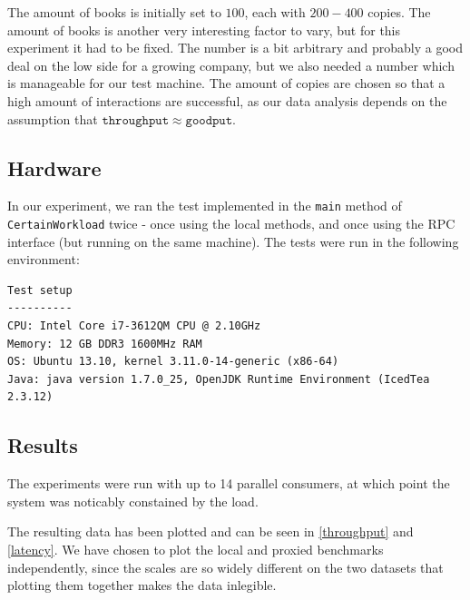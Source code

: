 \documentclass[11pt,a4paper]{article}
\begin{document}
The amount of books is initially set to $100$, each with $200-400$ copies.
The amount of books is another very interesting factor to vary, but for this
experiment it had to be fixed. The number is a bit arbitrary and probably a
good deal on the low side for a growing company, but we also needed a number
which is manageable for our test machine. The amount of copies are chosen so
that a high amount of interactions are successful, as our data analysis depends
on the assumption that $\mathtt{throughput} \approx \mathtt{goodput}$.

\subsection*{Hardware}
In our experiment, we ran the test implemented in the \texttt{main} method of
\texttt{CertainWorkload} twice - once using the local methods, and once using
the RPC interface (but running on the same machine). The tests were run in the
following environment:

\begin{verbatim}
Test setup
----------
CPU: Intel Core i7-3612QM CPU @ 2.10GHz
Memory: 12 GB DDR3 1600MHz RAM
OS: Ubuntu 13.10, kernel 3.11.0-14-generic (x86-64) 
Java: java version 1.7.0_25, OpenJDK Runtime Environment (IcedTea 2.3.12)
\end{verbatim}
\subsection{}

\subsection*{Results}

The experiments were run with up to 14 parallel consumers, at which point the
system was noticably constained by the load.

The resulting data has been plotted and can be seen in \autoref{throughput}
and \autoref{latency}. We have chosen to plot the local and proxied benchmarks
independently, since the scales are so widely different on the two datasets
that plotting them together makes the data inlegible.
\end{document}
